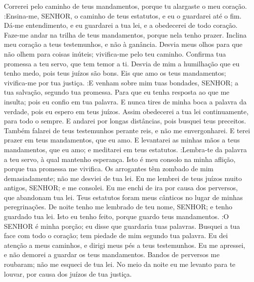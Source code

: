 {  Correrei pelo caminho de teus mandamentos, porque tu alargaste o meu coração.
   :Ensina-me, SENHOR, o caminho de teus estatutos, e eu o guardarei até o fim.
  Dá-me entendimento, e eu guardarei a tua lei, e a obedecerei de todo
{} coração.
  Faze-me andar na trilha de teus mandamentos, porque nela tenho prazer.
  Inclina meu coração a teus testemunhos, e não à ganância.
  Desvia meus olhos para que não olhem para coisas inúteis; vivifica-me pelo teu caminho.
  Confirma tua promessa a teu servo, que tem temor a ti.
  Desvia de mim a humilhação que eu tenho medo, pois teus juízos são bons.
  Eis que amo os teus mandamentos; vivifica-me por tua justiça.
   :E venham sobre mim tuas bondades, SENHOR;
{} a tua salvação, segundo tua promessa.
  Para que eu tenha resposta ao que me insulta; pois eu confio em tua palavra.
  E nunca tires de minha boca a palavra da verdade, pois eu espero em teus juízos.
  Assim obedecerei a tua lei continuamente, para todo o sempre.
  E andarei
{} por longas distâncias, pois busquei teus preceitos.
  Também falarei de teus testemunhos perante reis, e não me envergonharei.
  E terei prazer em teus mandamentos, que eu amo.
  E levantarei as minhas mãos a teus mandamentos, que eu amo; e meditarei em teus estatutos.
   :Lembra-te da palavra
{} a teu servo, à qual mantenho esperança.
  Isto é meu consolo na minha aflição, porque tua promessa me vivifica.
  Os arrogantes têm zombado de mim demasiadamente;
{} não me desviei de tua lei.
  Eu me lembrei de teus juízos muito antigos, SENHOR; e
{} me consolei.
  Eu me enchi de ira por causa dos perversos, que abandonam tua lei.
  Teus estatutos foram meus cânticos no lugar de minhas peregrinações.
  De noite tenho me lembrado de teu nome, SENHOR; e tenho guardado tua lei.
  Isto eu tenho feito, porque guardo teus mandamentos.
   :O SENHOR é minha porção; eu disse que guardaria tuas palavras.
  Busquei a tua face com todo o
{} coração; tem piedade de mim segundo tua palavra.
  Eu dei atenção a meus caminhos, e dirigi meus pés a teus testemunhos.
  Eu me apressei, e não demorei a guardar os teus mandamentos.
  Bandos de perversos me roubaram;
{} não me esqueci de tua lei.
  No meio da noite eu me levanto para te louvar, por causa dos juízos de tua justiça.
}
